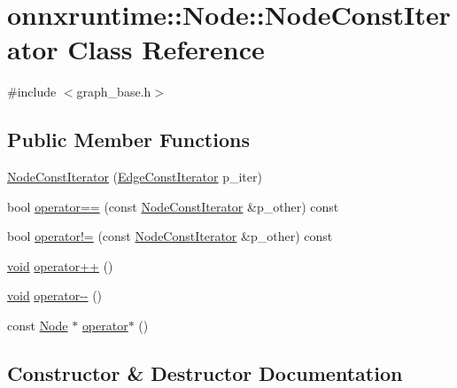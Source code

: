 \hypertarget{classonnxruntime_1_1Node_1_1NodeConstIterator}{}\section{onnxruntime\+:\+:Node\+:\+:Node\+Const\+Iterator Class Reference}
\label{classonnxruntime_1_1Node_1_1NodeConstIterator}


{\ttfamily \#include $<$graph\+\_\+base.\+h$>$}

\subsection*{Public Member Functions}
\begin{DoxyCompactItemize}
\item 
\mbox{\hyperlink{classonnxruntime_1_1Node_1_1NodeConstIterator_a9a3bf334dcd9909c3cb74d067d73dc25}{Node\+Const\+Iterator}} (\mbox{\hyperlink{classonnxruntime_1_1Node_ae0df52e26b0237505b6a0cbc25106d9d}{Edge\+Const\+Iterator}} p\+\_\+iter)
\item 
bool \mbox{\hyperlink{classonnxruntime_1_1Node_1_1NodeConstIterator_ada43b1cc76a427bb1d33f20d085f1aef}{operator==}} (const \mbox{\hyperlink{classonnxruntime_1_1Node_1_1NodeConstIterator}{Node\+Const\+Iterator}} \&p\+\_\+other) const
\item 
bool \mbox{\hyperlink{classonnxruntime_1_1Node_1_1NodeConstIterator_a8d30289ab0ccb7ff71fec635ad788c4c}{operator!=}} (const \mbox{\hyperlink{classonnxruntime_1_1Node_1_1NodeConstIterator}{Node\+Const\+Iterator}} \&p\+\_\+other) const
\item 
\mbox{\hyperlink{mlasi_8h_a88f941d423cb2a819b70a1358982b1a6}{void}} \mbox{\hyperlink{classonnxruntime_1_1Node_1_1NodeConstIterator_a3e6ecd9a6a369559ba1fbd0e03ff2cea}{operator++}} ()
\item 
\mbox{\hyperlink{mlasi_8h_a88f941d423cb2a819b70a1358982b1a6}{void}} \mbox{\hyperlink{classonnxruntime_1_1Node_1_1NodeConstIterator_acf1a51fc3b79959c861c9fae8f10e62b}{operator-\/-\/}} ()
\item 
const \mbox{\hyperlink{classonnxruntime_1_1Node}{Node}} $\ast$ \mbox{\hyperlink{classonnxruntime_1_1Node_1_1NodeConstIterator_abe0250a7466f7661fb85fada5624d645}{operator$\ast$}} ()
\end{DoxyCompactItemize}


\subsection{Constructor \& Destructor Documentation}
\mbox{\label{classonnxruntime_1_1Node_1_1NodeConstIterator_a9a3bf334dcd9909c3cb74d067d73dc25}} 
